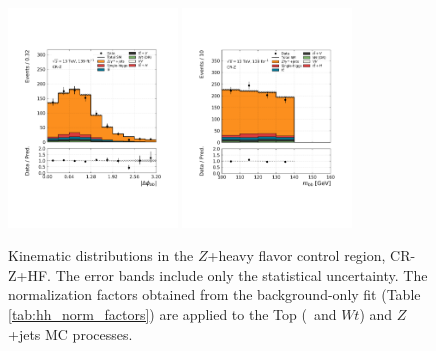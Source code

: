 \begin{figure}[!htb]
    \includegraphics[width=0.4\textwidth]{figures/search_hh/bkg_estimate/crvr/crzhf/crztest_dphi_bb}
    \includegraphics[width=0.4\textwidth]{figures/search_hh/bkg_estimate/crvr/crzhf/crztest_mbb}
    \caption{
    Kinematic distributions in the $Z$+heavy flavor control region, CR-Z+HF.
    The error bands include only the statistical uncertainty.
    The normalization factors obtained from the background-only fit (Table \ref{tab:hh_norm_factors}) are applied
    to the Top (\ttbar~and $Wt$) and $Z$+jets MC processes.
    }
    \label{fig:crz_kin_plots_1}
\end{figure}
